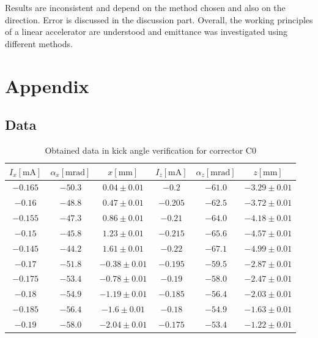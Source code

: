 \documentclass[12pt]{article}
\begin{document}
Results are inconsistent and depend on the method chosen and also on the direction.  Error is discussed in the discussion part. Overall, the working principles of a linear accelerator are understood and emittance was investigated using different methods. 
         

\printbibliography

\section{Appendix}
\appendix
\subsection{Data}

\begin{table}[H]
    \centering
    \begin{tabular}{c|c|c|c|c|c}
        \hline
        \hline
        $I_x \mathrm{[mA]}$ & $\alpha_x \mathrm{[mrad]}$ & $x \mathrm{[mm]}$ &$I_z \mathrm{[mA]}$ & $\alpha_z \mathrm{[mrad]}$ & $z \mathrm{[mm]}$ \\
        \hline
        $ -0.165 $ & $ -50.3 $ & $ 0.04 \pm 0.01$ & $ -0.2 $ & $ -61.0 $ & $ -3.29 \pm 0.01$ \\ 
        $ -0.16 $ & $ -48.8 $ & $ 0.47 \pm 0.01$ &$ -0.205 $ & $ -62.5 $ & $ -3.72 \pm 0.01$ \\ 
        $ -0.155 $ & $ -47.3 $ & $ 0.86 \pm 0.01$ &$ -0.21 $ & $ -64.0 $ & $ -4.18 \pm 0.01$ \\ 
        $ -0.15 $ & $ -45.8 $ & $ 1.23 \pm 0.01$ &$ -0.215 $ & $ -65.6 $ & $ -4.57 \pm 0.01$ \\ 
        $ -0.145 $ & $ -44.2 $ & $ 1.61 \pm 0.01$ &$ -0.22 $ & $ -67.1 $ & $ -4.99 \pm 0.01$ \\ 
        $ -0.17 $ & $ -51.8 $ & $ -0.38 \pm 0.01$ &$ -0.195 $ & $ -59.5 $ & $ -2.87 \pm 0.01$ \\ 
        $ -0.175 $ & $ -53.4 $ & $ -0.78 \pm 0.01$ &$ -0.19 $ & $ -58.0 $ & $ -2.47 \pm 0.01$ \\ 
        $ -0.18 $ & $ -54.9 $ & $ -1.19 \pm 0.01$ &$ -0.185 $ & $ -56.4 $ & $ -2.03 \pm 0.01$ \\ 
        $ -0.185 $ & $ -56.4 $ & $ -1.6 \pm 0.01$ &$ -0.18 $ & $ -54.9 $ & $ -1.63 \pm 0.01$ \\ 
        $ -0.19 $ & $ -58.0 $ & $ -2.04 \pm 0.01$ &$ -0.175 $ & $ -53.4 $ & $ -1.22 \pm 0.01$ \\
        \hline
    \end{tabular}
    \caption{Obtained data in kick angle verification for corrector C0}
    \label{C0row}
\end{table}
\end{document}
